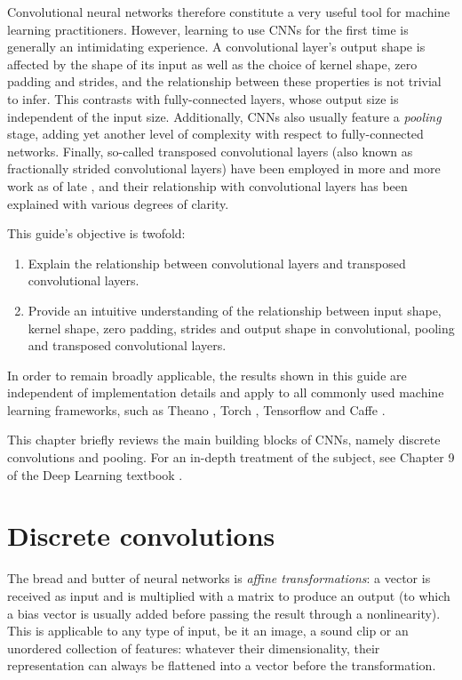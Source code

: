\documentclass[notitlepage]{report}
\begin{document}
Convolutional neural networks therefore constitute a very useful tool for
machine learning practitioners. However, learning to use CNNs for the first time
is generally an intimidating experience. A convolutional layer's output shape is
affected by the shape of its input as well as the choice of kernel shape, zero
padding and strides, and the relationship between these properties is not
trivial to infer. This contrasts with fully-connected layers, whose output size
is independent of the input size. Additionally, CNNs also usually feature a {\em
pooling} stage, adding yet another level of complexity with respect to
fully-connected networks.  Finally, so-called transposed convolutional layers
(also known as fractionally strided convolutional layers) have been employed in
more and more work as of late \citep{zeiler2011adaptive,zeiler2014visualizing,
long2015fully,radford2015unsupervised,visin15,im2016generating}, and their
relationship with convolutional layers has been explained with various degrees
of clarity.

This guide's objective is twofold:

\begin{enumerate}
    \item Explain the relationship between convolutional layers and transposed
        convolutional layers.
    \item Provide an intuitive understanding of the relationship between input
        shape, kernel shape, zero padding, strides and output shape in
        convolutional, pooling and transposed convolutional layers.
\end{enumerate}

In order to remain broadly applicable, the results shown in this guide are
independent of implementation details and apply to all commonly used machine
learning frameworks, such as Theano
\citep{bergstra2010theano,bastien2012theano}, Torch \citep{collobert2011torch7},
Tensorflow \citep{abaditensorflow} and Caffe \citep{jia2014caffe}.

This chapter briefly reviews the main building blocks of CNNs, namely discrete
convolutions and pooling. For an in-depth treatment of the subject, see Chapter
9 of the Deep Learning textbook \citep{Goodfellow-et-al-2016-Book}.

\section{Discrete convolutions}

The bread and butter of neural networks is \emph{affine transformations}: a
vector is received as input and is multiplied with a matrix to produce an
output (to which a bias vector is usually added before passing the result
through a nonlinearity). This is applicable to any type of input, be it an
image, a sound clip or an unordered collection of features: whatever their
dimensionality, their representation can always be flattened into a vector
before the transformation.
\end{document}

